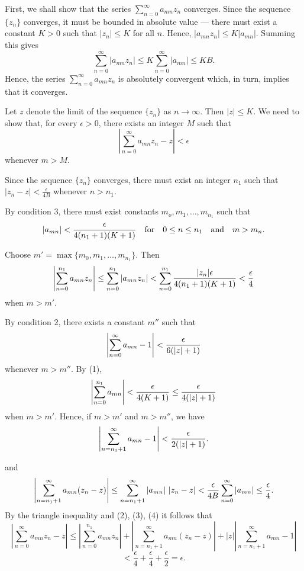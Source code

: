 \documentclass[12pt]{article}
\begin{document}
First, we shall show that the series $\sum_{n=0}^\infty a_{mn} z_n$ converges.  Since the sequence $\{z_n\}$ converges, it must be bounded in absolute value --- there must exist a constant $K > 0$ 
such that $|z_n| \le K$ for all $n$.  Hence,  $|a_{mn} z_n| \le K |a_{mn}|.$  Summing this gives
 $$\sum_{n=0}^\infty |a_{mn} z_n| \le K \sum_{n=0}^\infty |a_{mn}| \le KB.$$
Hence, the series $\sum_{n=0}^\infty a_{mn} z_n$ is absolutely convergent which, in turn, implies that it converges.

 Let $z$ denote the limit of the sequence $\{z_n\}$ as $n \to \infty$. Then $\vert z \vert \le K$.
 We need to show that, for every $\epsilon > 0$, there exists an integer $M$ such that
 $$\left| \sum_{n=0}^\infty a_{mn} z_n - z \right| < \epsilon$$
whenever $m > M$.

Since the sequence $\{z_n\}$ converges, there must exist an integer $n_1$ such that
 $|z_n - z| < \frac{\epsilon}{4B}$ whenever $n > n_1$.  

By condition 3, there must exist constants $m_o,m_1,  \ldots , m_{n_1}$ such that 
\begin{equation}
|a_{mn}| < {\epsilon \over 4 (n_1 +1)(K+1)} \quad \textrm{for} \quad  0 \le n \le n_1 \quad \textrm{and} \quad  m > m_n.
\end{equation}
  
Choose $m'= \max\{ m_0,m_1,  \ldots, m_{n_1} \}.$  Then 
\begin{equation}
\left| \sum_{n=0}^{n_1} a_{mn} z_n \right| \le \sum_{n=0}^{n_1} |a_{mn} z_n| < \sum_{n=0}^{n_1} {|z_n| \epsilon \over 4 (n_1+1) (K+1)} < {\epsilon \over 4}
\end{equation}
when $m > m'.$

By condition 2, there  exists a constant $m''$ such that
 $$\left| \sum_{n=0}^\infty a_{mn} - 1 \right| < {\epsilon \over 6 (|z|+1)}$$
whenever $m > m''$.  By (1),
 $$\left| \sum_{n=0}^{n_1} a_{mn} \right| < {\epsilon \over 4(K+1)} \le {\epsilon \over 4(|z|+1)}$$
when $m > m'$.  Hence, if $m > m'$ and $m > m''$, we have
\begin{equation}
\left| \sum_{n=n_1 + 1}^\infty a_{mn} - 1 \right| < {\epsilon \over 2(|z|+1)}.
\end{equation}

and
\begin{equation}
 \left| \sum_{n=n_1 + 1}^\infty a_{mn} (z_n - z) \right| \le \sum_{n=n_1 + 1}^\infty |a_{mn}| ~ |z_n - z| < {\epsilon \over 4B} \sum_{n=0}^\infty |a_{mn}| \le {\epsilon \over 4}.
\end{equation}
By the triangle inequality and (2), (3), (4) it follows that
 $$\left| \sum_{n=0}^\infty a_{mn} z_n - z \right| \le \left| \sum_{n=0}^{n_1} a_{mn} z_n \right| + \left| \sum_{n=n_1 + 1}^\infty a_{mn} (z_n - z) \right| + |z| \left| \sum_{n=n_1 + 1}^\infty a_{mn} - 1 \right|$$
$$ 
< \frac{\epsilon}{4} + \frac{\epsilon}{4} + \frac{\epsilon}{2} = \epsilon.
$$


\end{document}
